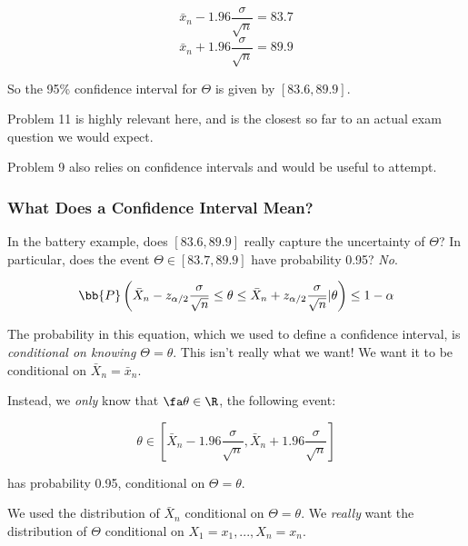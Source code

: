 \documentclass[a4paper]{article}
\begin{document}
                \[
                    \bar x_n - 1.96 \frac{\sigma}{\sqrt{n}} = 83.7
                \]
                \[
                    \bar x_n + 1.96 \frac{\sigma}{\sqrt{n}} = 89.9
                \]

                So the 95\% confidence interval for $\Theta$ is given by
                $[83.6, 89.9]$.

                \begin{relq}
                    Problem 11 is highly relevant here, and is the closest so
                    far to an actual exam question we would expect.

                    Problem 9 also relies on confidence intervals and would be
                    useful to attempt.
                \end{relq}

            \subsubsection{What Does a Confidence Interval Mean?}
                In the battery example, does $[83.6, 89.9]$ really capture the
                uncertainty of $\Theta$? In particular, does the event $\Theta
                \in [83.7, 89.9]$ have probability 0.95? \textit{No}.

                \[
                    \bb{P}\left(\bar X_n - z_{\alpha/2} \frac{\sigma}{\sqrt{n}}
                    \leq \theta \leq \bar X_n + z_{\alpha/2}
                    \frac{\sigma}{\sqrt{n}}|\theta\right) \leq 1 - \alpha
                \]

                The probability in this equation, which we used to define a
                confidence interval, is \textit{conditional on knowing $\Theta =
                \theta$}. This isn't really what we want! We want it to be
                conditional on $\bar X_n = \bar x_n$.

                Instead, we \textit{only} know that $\fa \theta \in \R$, the
                following event:

                \[
                    \theta \in \left[\bar X_n - 1.96 \frac{\sigma}{\sqrt{n}},
                    \bar X_n + 1.96 \frac{\sigma}{\sqrt{n}}\right]
                \]

                has probability 0.95, conditional on $\Theta = \theta$.

                We used the distribution of $\bar X_n$ conditional on $\Theta =
                \theta$. We \textit{really} want the distribution of $\Theta$
                conditional on $X_1 = x_1, ..., X_n = x_n$.
\end{document}
